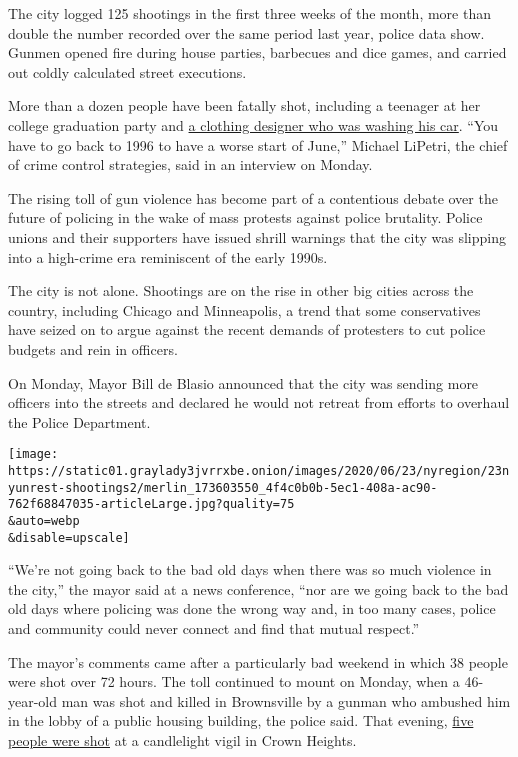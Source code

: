 The city logged 125 shootings in the first three weeks of the month,
more than double the number recorded over the same period last year,
police data show. Gunmen opened fire during house parties, barbecues and
dice games, and carried out coldly calculated street executions.

More than a dozen people have been fatally shot, including a teenager at
her college graduation party and
\href{https://www.nydailynews.com/new-york/nyc-crime/ny-man-fatally-shot-brooklyn-gun-violence-soars-20200620-pp3uqtsenbf63n4aei3tw265ou-story.html}{a
clothing designer who was washing his car}. ``You have to go back to
1996 to have a worse start of June,'' Michael LiPetri, the chief of
crime control strategies, said in an interview on Monday.

The rising toll of gun violence has become part of a contentious debate
over the future of policing in the wake of mass protests against police
brutality. Police unions and their supporters have issued shrill
warnings that the city was slipping into a high-crime era reminiscent of
the early 1990s.

The city is not alone. Shootings are on the rise in other big cities
across the country, including Chicago and Minneapolis, a trend that some
conservatives have seized on to argue against the recent demands of
protesters to cut police budgets and rein in officers.

On Monday, Mayor Bill de Blasio announced that the city was sending more
officers into the streets and declared he would not retreat from efforts
to overhaul the Police Department.

\texttt{[image: https://static01.graylady3jvrrxbe.onion/images/2020/06/23/nyregion/23nyunrest-shootings2/merlin\_173603550\_4f4c0b0b-5ec1-408a-ac90-762f68847035-articleLarge.jpg?quality=75\\\&auto=webp\\\&disable=upscale]}

``We're not going back to the bad old days when there was so much
violence in the city,'' the mayor said at a news conference, ``nor are
we going back to the bad old days where policing was done the wrong way
and, in too many cases, police and community could never connect and
find that mutual respect.''

The mayor's comments came after a particularly bad weekend in which 38
people were shot over 72 hours. The toll continued to mount on Monday,
when a 46-year-old man was shot and killed in Brownsville by a gunman
who ambushed him in the lobby of a public housing building, the police
said. That evening,
\href{https://www.nydailynews.com/new-york/nyc-crime/ny-brooklyn-candlelight-vigil-shooting-20200623-wycautxxpjg5lixa6jvat3kzli-story.html}{five
people were shot} at a candlelight vigil in Crown Heights.

